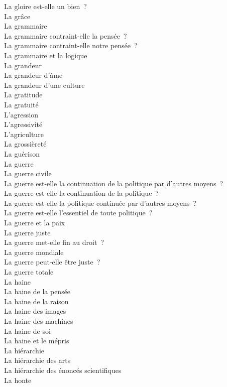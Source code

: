 \documentclass[a4paper,12pt]{article}
\begin{document}
La gloire est-elle un bien ? \\
La grâce \\
La grammaire \\
La grammaire contraint-elle la pensée ? \\
La grammaire contraint-elle notre pensée ? \\
La grammaire et la logique \\
La grandeur \\
La grandeur d'âme \\
La grandeur d'une culture \\
La gratitude \\
La gratuité \\
L'agression \\
L'agressivité \\
L'agriculture \\
La grossièreté \\
La guérison \\
La guerre \\
La guerre civile \\
La guerre est-elle la continuation de la politique par d'autres moyens ? \\
La guerre est-elle la continuation de la politique ? \\
La guerre est-elle la politique continuée par d'autres moyens ? \\
La guerre est-elle l'essentiel de toute politique ? \\
La guerre et la paix \\
La guerre juste \\
La guerre met-elle fin au droit ? \\
La guerre mondiale \\
La guerre peut-elle être juste ? \\
La guerre totale \\
La haine \\
La haine de la pensée \\
La haine de la raison \\
La haine des images \\
La haine des machines \\
La haine de soi \\
La haine et le mépris \\
La hiérarchie \\
La hiérarchie des arts \\
La hiérarchie des énoncés scientifiques \\
La honte \\
\end{document}

